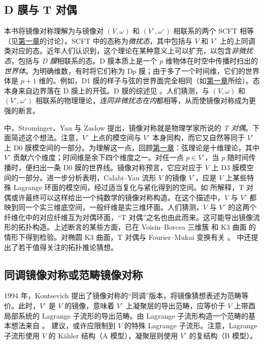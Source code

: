 \subsection{D 膜与 T 对偶}\label{subsec:d-branes-t-duality}
本书将镜像对称理解为与镜像对 $(V,\omega)$ 和 $(V^\circ,\omega^\circ)$ 相联系的两个 SCFT 相等（见\hyperref[chap:introduction]{第一章}的讨论）。SCFT 中的态称为\emph{微扰态}，其中包括与 $V$ 和 $V^\circ$ 上的上同调类对应的态。近年人们认识到，这个理论在某种意义上可以扩充，以包含\emph{非微扰态}，包括与 \emph{D 膜}相联系的态。D 膜本质上是一个 $p$ 维物体在时空中传播时扫出的\emph{世界体}。为明确维数，有时将它们称为 D$p$ 膜；由于多了一个时间维，它们的世界体是 $p+1$ 维的。例如，D1 膜的样子与弦的世界面完全相同（如\hyperref[chap:introduction]{第一章}所绘）。态本身来自边界落在 D 膜上的开弦。D 膜的综述见 。人们猜测，与 $(V,\omega)$ 和 $(V^\circ,\omega^\circ)$ 相联系的物理理论，\emph{连同非微扰态在内}都相等，从而使镜像对称成为更强的断言。

 中，Strominger、Yau 与 Zaslow 提出，镜像对称就是物理学家所说的 \emph{T 对偶}。下面简述这个想法。注意，$V^\circ$ 上点的模空间与 $V^\circ$ 本身同构，而它又自然等同于 $V^\circ$ 上 D0 膜模空间的一部分。为理解这一点，回顾\hyperref[chap:introduction]{第一章}：弦理论是十维理论，其中 $V^\circ$ 贡献六个维度；时间维是余下四个维度之一。对任一点 $p\in V^\circ$，当 $p$ 随时间传播时，便扫出一条 D0 膜的世界线。镜像对称预言，它应对应于 $V$ 上 D3 膜模空间的一部分。进一步分析表明，Calabi--Yau 流形 $V$ 的镜像 $V^\circ$，应是 $V$ 上某些特殊 Lagrange 环面的模空间，经过适当复化与紧化得到的空间。如  所解释，T 对偶或许最终可以这样给出一个纯数学的镜像对称构造。在这个描述中，$V$ 与 $V^\circ$ 都映到同一个实三维底空间，一般纤维是实三维环面。人们猜测，$V$ 与 $V^\circ$ 的这两个纤维化中的对应纤维互为对偶环面，“T 对偶”之名也由此而来。这可能导出镜像流形的拓扑构造。上述断言的某些方面，已在 Voisin--Borcea 三维簇  和 K3 曲面
 的情形下得到检验。对椭圆 K3 曲面，T 对偶与 Fourier--Mukai 变换有关 。 中还提出了若干值得关注的拓扑推论猜想。

\subsection{同调镜像对称或范畴镜像对称}\label{subsec:homological-categorical-mirror}
1994 年，Kontsevich  提出了镜像对称的“同调”版本，将镜像猜想表述为范畴等价。此时，$V^\circ$ 是 $V$ 的镜像，意味着 $V^\circ$ 上凝聚层的导出范畴，应等价于 $V$ 上带酉局部系统的 Lagrange 子流形的导出范畴。由 Lagrange 子流形构造一个范畴的基本想法来自 。 建议，或许应限制到 $V$ 的特殊 Lagrange 子流形。注意，Lagrange 子流形使用 $V$ 的 Kähler 结构（A 模型），凝聚层则使用 $V^\circ$ 的复结构（B 模型）。


